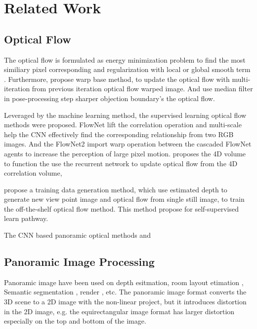 \section{Related Work}

\subsection{Optical Flow}

The optical flow is formulated as energy minimization problem to find the most similiary pixel corresponding and regularization with local or global smooth term \cite{KroegTDV2016, HornS1981, BA}. 
Furthermore, \citet{BroxBPW2004} propose warp base method, to update the optical flow with multi-iteration from previous iteration optical flow warped image. 
And \cite{SunRB2010} use median filter in pose-processing step sharper objection boundary's the optical flow.

Leveraged by the machine learning method, the supervised learning optical flow methods were proposed.
FlowNet\cite{DosovFIHHGSCB2015} lift the correlation operation and multi-scale help the CNN effectively find the corresponding relationship from two RGB images. And the FlowNet2 \cite{IlgMSKDB2017} import warp operation between the cascaded FlowNet agents to increase the perception of large pixel motion.
%
\citet{SunYLK2020}  proposes the 4D volume to function the 
%
\citet{TeedD2020a} use the recurrent network to update optical flow from the 4D correlation volume, 


\citet{AleotPM2021} propose a training data generation method, 
which use estimated depth to generate new view point image and optical flow from single still image, to train the off-the-shelf optical flow method.
This method propose for self-supervised learn pathway.

The CNN based panoramic optical methods
\citet{ArtizZAD2021} and \citet{BhandZY2021}


\subsection{Panoramic Image Processing}

Panoramic image have been used on 
depth esitmation\cite{WangSTCS2020}, room layout etimation \cite{WangYSCT2021, Tran2021}, Semantic segmentation \cite{YangZRHS2021}, render \cite{XuZXTG2021}, etc.
The panoramic image format converts the 3D scene to a 2D image with the non-linear project, but it introduces distortion in the 2D image, e.g. the equirectangular image format has larger distortion especially on the top and bottom of the image.

